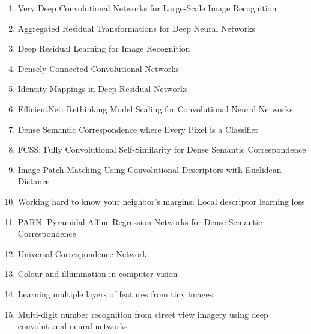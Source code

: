 \documentclass[acmlarge]{acmart}
\begin{document}
\begin{enumerate}
	\item Very Deep Convolutional Networks for Large-Scale Image Recognition \cite{simonyan2014deep} 

	\item Aggregated Residual Transformations for Deep Neural Networks \cite{xie2016aggregated} 

	\item Deep Residual Learning for Image Recognition \cite{he2015deep} 

	\item Densely Connected Convolutional Networks \cite{huang2016densely} 

	\item Identity Mappings in Deep Residual Networks \cite{he2016identity} 

	\item EfficientNet: Rethinking Model Scaling for Convolutional Neural Networks \cite{tan2019efficientnet} 

	\item Dense Semantic Correspondence where Every Pixel is a Classifier \cite{bristow2015dense} 

	\item FCSS: Fully Convolutional Self-Similarity for Dense Semantic Correspondence \cite{kim2017fcss} 

	\item Image Patch Matching Using Convolutional Descriptors with Euclidean Distance \cite{melekhov2017image} 

	\item Working hard to know your neighbor's margins: Local descriptor learning loss \cite{mishchuk2017working} 

	\item PARN: Pyramidal Affine Regression Networks for Dense Semantic Correspondence \cite{jeon2018parn} 

	\item Universal Correspondence Network \cite{choy2016universal} 

	\item Colour and illumination in computer vision \cite{Finlayson2018ColourAI} 

	\item Learning multiple layers of features from tiny images \cite{krizhevsky2009learning} 

	\item Multi-digit number recognition from street view imagery using deep convolutional neural networks \cite{goodfellow2013multi} 


\end{enumerate}
\end{document}
